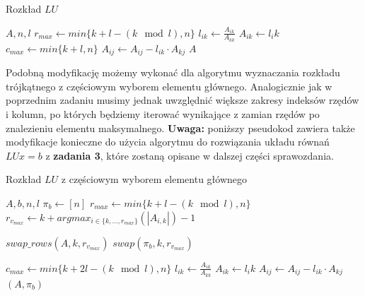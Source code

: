 \documentclass[11pt]{article}
\begin{document}
        \begin{algorithm}[h!]
        \caption{Rozkład $LU$}
        \label{alg:lu_decomposition_default}
        \begin{algorithmic}[1]
            \Require $A, n, l$
                \State $r_{max} \gets min\{k + l - (k \mod l), n\}$
                    \State $l_{ik} \gets \frac{A_{ik}}{A_{kk}}$
                    \State $A_{ik} \gets l_ik$
                    \State $c_{max} \gets min\{k + l, n\}$
                        \State $A_{ij} \gets A_{ij} - l_{ik} \cdot A_{kj}$
                    \EndFor
                \EndFor
            \EndFor
            \State \Return $A$
        \end{algorithmic}
        \end{algorithm}

        \noindent\newline
        \noindent
        Podobną modyfikację możemy wykonać dla algorytmu wyznaczania rozkładu trójkątnego z częściowym wyborem elementu głównego. Analogicznie jak w poprzednim zadaniu musimy jednak uwzględnić większe zakresy indeksów rzędów i kolumn, po których będziemy iterować wynikające z zamian rzędów po znalezieniu elementu maksymalnego.
        \newline\newline
        \textbf{Uwaga:} poniższy pseudokod zawiera także modyfikacje konieczne do użycia algorytmu do rozwiązania układu równań $LUx = b$ z \textbf{zadania 3}, które zostaną opisane w dalszej części sprawozdania.

        \begin{algorithm}[h!]
        \caption{Rozkład $LU$ z częściowym wyborem elementu głównego}
        \label{alg:lu_decomposition_partial_pivot}
        \begin{algorithmic}[1]
            \Require $A, b, n, l$
            \State $\pi_b \gets [n]$
                \State $r_{max} \gets min\{k + l - (k \mod l), n\}$
                \State $r_{v_{max}} \gets k + argmax_{i \in \{k, ..., r_{max}\}}(|A_{i, k}|) - 1$

                    \State $swap\_rows(A, k, r_{v_{max}})$
                    \State $swap(\pi_b, k, r_{v_{max}})$
                \EndIf

                \State $c_{max} \gets min\{k + 2l - (k \mod l), n\}$
                    \State $l_{ik} \gets \frac{A_{ik}}{A_{kk}}$
                    \State $A_{ik} \gets l_ik$
                        \State $A_{ij} \gets A_{ij} - l_{ik} \cdot A_{kj}$
                    \EndFor
                \EndFor
            \EndFor
            \State \Return $(A, \pi_b)$
        \end{algorithmic}
        \end{algorithm}
\end{document}
